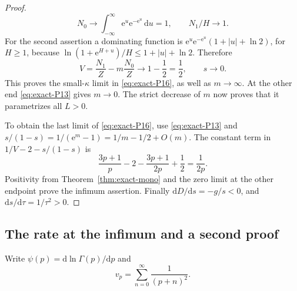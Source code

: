 \begin{proof}
\begin{equation}
 N_0\to\int_{-\infty}^\infty \mathrm{e}^u \mathrm{e}^{-\mathrm{e}^u}\,\mathrm{d}u=1,
 \qquad N_1/H\to1.
\end{equation}
For the second assertion a dominating function is
\(\mathrm{e}^u \mathrm{e}^{-\mathrm{e}^u}(1+|u|+\ln2)\), for \(H\ge1\), because
\(\ln(1+\mathrm{e}^{H+u})/H\le1+|u|+\ln2\). Therefore
\begin{equation}
 V=\frac{N_1}{Z}-m\frac{N_0}{Z}\longrightarrow1-\frac12=\frac12,
 \qquad s\to0.
\end{equation}
This proves the small-$\kappa$ limit in \eqref{eq:exact-P16}, as well as \(m\to\infty\). At the other end \eqref{eq:exact-P13} gives \(m\to0\). The strict decrease of \(m\) now proves that it parametrizes all \(L>0\).

To obtain the last limit of \eqref{eq:exact-P16}, use \eqref{eq:exact-P13} and
\(s/(1-s)=1/(\mathrm{e}^m-1)=1/m-1/2+O(m)\). The constant term in
\(1/V-2-s/(1-s)\) is
\begin{equation}
 \frac{3p+1}{p}-2-\frac{3p+1}{2p}+\frac12=\frac1{2p}.
\end{equation}
Positivity from Theorem~\ref{thm:exact-mono} and the zero limit at the other endpoint prove the infimum assertion. Finally \(\mathrm{d}D/\mathrm{d}s=-g/s<0\), and \(\mathrm{d}s/\mathrm{d}\tau=1/\tau^2>0\). \end{proof}

\subsection{The rate at the infimum and a second proof}

Write \(\psi(p)=\mathrm{d}\ln\Gamma(p)/\mathrm{d}p\) and
\begin{equation}
 v_p=\sum_{n=0}^\infty\frac1{(p+n)^2}.
\end{equation}

